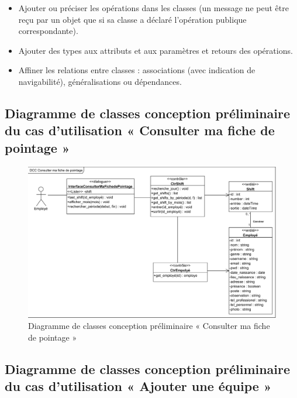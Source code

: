 \begin{itemize}

    \item [\textbullet] Ajouter ou préciser les opérations dans les classes 
        (un message ne peut être reçu par un objet que si sa classe a déclaré 
        l’opération publique correspondante).
        
    \item [\textbullet] Ajouter des types aux attributs et aux paramètres et 
        retours des opérations. 
        
    \item [\textbullet] Affiner les relations entre classes : associations 
        (avec indication de navigabilité), généralisations ou dépendances.\cite{5}
                    
\end{itemize}
    
\clearpage

\subsection*{Diagramme de classes conception préliminaire du cas d'utilisation « Consulter ma fiche de pointage »}

\begin{figure}[h!]
    \centering
    \includegraphics[scale=0.77]{images/DCC/DCC Consulter ma fiche de pointage.png}
    \caption{Diagramme de classes conception préliminaire « Consulter ma fiche de pointage »}
    \label{fig42}
\end{figure}
        
\subsection*{Diagramme de classes conception préliminaire du cas d'utilisation « Ajouter une équipe »}

